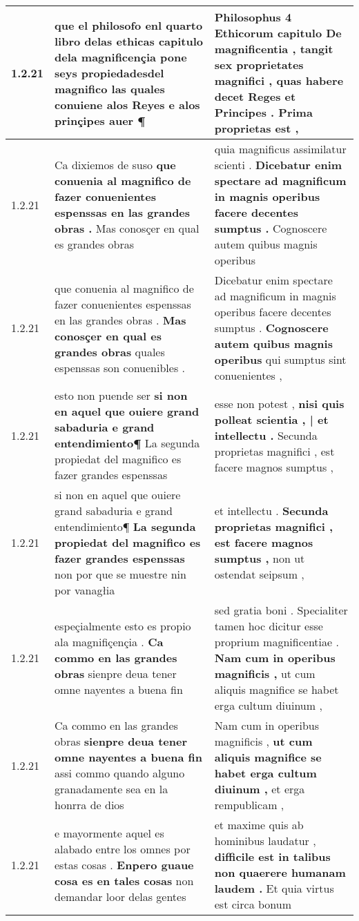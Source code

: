 \begin{tabular}{|p{1cm}|p{6.5cm}|p{6.5cm}|}
1.2.21 & que el philosofo enl quarto libro delas ethicas capitulo dela magnificençia \textbf{ pone seys propiedadesdel magnifico } las quales conuiene alos Reyes e alos prinçipes auer ¶ & Philosophus 4 Ethicorum capitulo De magnificentia , \textbf{ tangit sex proprietates magnifici , } quas habere decet Reges et Principes . Prima proprietas est , \\\hline
1.2.21 & Ca dixiemos de suso \textbf{ que conuenia al magnifico de fazer conuenientes espenssas en las grandes obras . } Mas conosçer en qual es grandes obras & quia magnificus assimilatur scienti . \textbf{ Dicebatur enim spectare ad magnificum in magnis operibus facere decentes sumptus . } Cognoscere autem quibus magnis operibus \\\hline
1.2.21 & que conuenia al magnifico de fazer conuenientes espenssas en las grandes obras . \textbf{ Mas conosçer en qual es grandes obras } quales espenssas son conuenibles . & Dicebatur enim spectare ad magnificum in magnis operibus facere decentes sumptus . \textbf{ Cognoscere autem quibus magnis operibus } qui sumptus sint conuenientes , \\\hline
1.2.21 & esto non puende ser \textbf{ si non en aquel que ouiere grand sabaduria e grand entendimiento¶ } La segunda propiedat del magnifico es fazer grandes espenssas & esse non potest , \textbf{ nisi quis polleat scientia , | et intellectu . } Secunda proprietas magnifici , est facere magnos sumptus , \\\hline
1.2.21 & si non en aquel que ouiere grand sabaduria e grand entendimiento¶ \textbf{ La segunda propiedat del magnifico es fazer grandes espenssas } non por que se muestre nin por vanagłia & et intellectu . \textbf{ Secunda proprietas magnifici , est facere magnos sumptus , } non ut ostendat seipsum , \\\hline
1.2.21 & espeçialmente esto es propio ala magnifiçençia . \textbf{ Ca commo en las grandes obras } sienpre deua tener omne nayentes a buena fin & sed gratia boni . Specialiter tamen hoc dicitur esse proprium magnificentiae . \textbf{ Nam cum in operibus magnificis , } ut cum aliquis magnifice se habet erga cultum diuinum , \\\hline
1.2.21 & Ca commo en las grandes obras \textbf{ sienpre deua tener omne nayentes a buena fin } assi commo quando alguno granadamente sea en la honrra de dios & Nam cum in operibus magnificis , \textbf{ ut cum aliquis magnifice se habet erga cultum diuinum , } et erga rempublicam , \\\hline
1.2.21 & e mayormente aquel es alabado entre los omnes por estas cosas . \textbf{ Enpero guaue cosa es en tales cosas } non demandar loor delas gentes & et maxime quis ab hominibus laudatur , \textbf{ difficile est in talibus non quaerere humanam laudem . } Et quia virtus est circa bonum \\\hline

\end{tabular}
